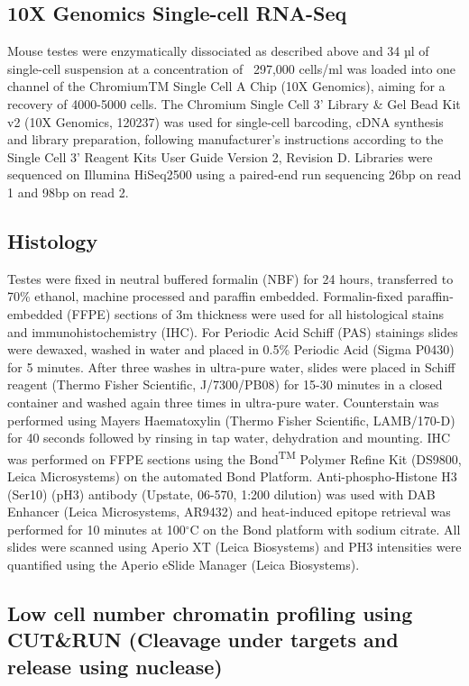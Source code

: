 \subsection{10X Genomics Single-cell RNA-Seq}

Mouse testes were enzymatically dissociated as described above and 34 µl of single-cell suspension at a concentration of ~297,000 cells/ml was loaded into one channel of the ChromiumTM Single Cell A Chip (10X Genomics\textsuperscript{\textregistered}), aiming for a recovery of 4000-5000 cells. The Chromium Single Cell 3’ Library \& Gel Bead Kit v2 (10X Genomics\textsuperscript{\textregistered}, 120237) was used for single-cell barcoding, cDNA synthesis and library preparation, following manufacturer’s instructions according to the Single Cell 3’ Reagent Kits User Guide Version 2, Revision D. Libraries were sequenced on Illumina HiSeq2500 using a paired-end run sequencing 26bp on read 1 and 98bp on read 2. 

\subsection{Histology}
Testes were fixed in neutral buffered formalin (NBF) for 24 hours, transferred to 70\% ethanol, machine processed and paraffin embedded. Formalin-fixed paraffin-embedded (FFPE) sections of 3\textmu{}m thickness were used for all histological stains and immunohistochemistry (IHC). For Periodic Acid Schiff (PAS) stainings slides were dewaxed, washed in water and placed in 0.5\% Periodic Acid (Sigma P0430) for 5 minutes. After three washes in ultra-pure water, slides were placed in Schiff reagent (Thermo Fisher Scientific, J/7300/PB08) for 15-30 minutes in a closed container and washed again three times in ultra-pure water. Counterstain was performed using Mayers Haematoxylin (Thermo Fisher Scientific, LAMB/170-D) for 40 seconds followed by rinsing in tap water, dehydration and mounting. IHC was performed on FFPE sections using the Bond\textsuperscript{TM} Polymer Refine Kit (DS9800, Leica Microsystems) on the automated Bond Platform. Anti-phospho-Histone H3 (Ser10) (pH3) antibody (Upstate, 06-570, 1:200 dilution) was used with DAB Enhancer (Leica Microsystems, AR9432) and heat-induced epitope retrieval was performed for 10 minutes at 100$^\circ$C on the Bond platform with sodium citrate. All slides were scanned using Aperio XT (Leica Biosystems) and PH3 intensities were quantified using the Aperio eSlide Manager (Leica Biosystems). 

\subsection{Low cell number chromatin profiling using CUT\&{}RUN (Cleavage under targets and release using nuclease)}
\label{appA.2.CnR}

